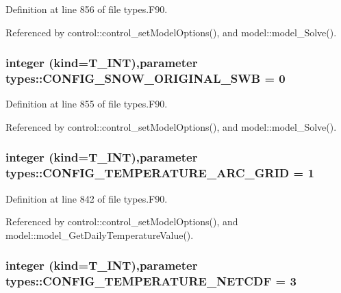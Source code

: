 Definition at line 856 of file types.F90.



Referenced by control::control\_\-setModelOptions(), and model::model\_\-Solve().

\hypertarget{namespacetypes_aa50ad6a9ffea3de1d907fcde9d600afa}{
\subsubsection[{CONFIG\_\-SNOW\_\-ORIGINAL\_\-SWB}]{\setlength{\rightskip}{0pt plus 5cm}integer (kind={\bf T\_\-INT}),parameter {\bf types::CONFIG\_\-SNOW\_\-ORIGINAL\_\-SWB} = 0}}
\label{namespacetypes_aa50ad6a9ffea3de1d907fcde9d600afa}


Definition at line 855 of file types.F90.



Referenced by control::control\_\-setModelOptions(), and model::model\_\-Solve().

\hypertarget{namespacetypes_a6d33c5d4a9049260961a4a2ab73ea6c1}{
\subsubsection[{CONFIG\_\-TEMPERATURE\_\-ARC\_\-GRID}]{\setlength{\rightskip}{0pt plus 5cm}integer (kind={\bf T\_\-INT}),parameter {\bf types::CONFIG\_\-TEMPERATURE\_\-ARC\_\-GRID} = 1}}
\label{namespacetypes_a6d33c5d4a9049260961a4a2ab73ea6c1}


Definition at line 842 of file types.F90.



Referenced by control::control\_\-setModelOptions(), and model::model\_\-GetDailyTemperatureValue().

\hypertarget{namespacetypes_a8c7057d336d6c65e7b528b189e6383ff}{
\subsubsection[{CONFIG\_\-TEMPERATURE\_\-NETCDF}]{\setlength{\rightskip}{0pt plus 5cm}integer (kind={\bf T\_\-INT}),parameter {\bf types::CONFIG\_\-TEMPERATURE\_\-NETCDF} = 3}}
\label{namespacetypes_a8c7057d336d6c65e7b528b189e6383ff}


